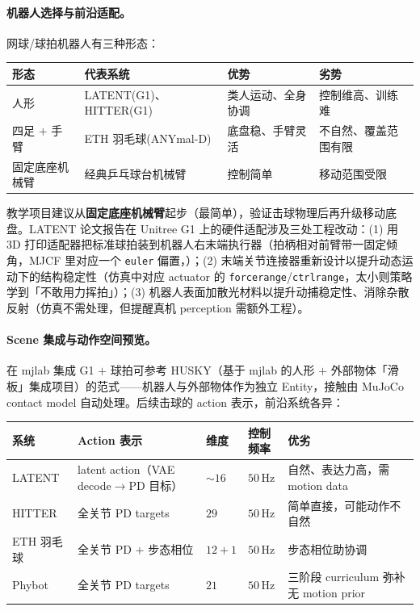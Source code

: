 \paragraph{机器人选择与前沿适配。}网球/球拍机器人有三种形态：

\begin{center}
\small
\begin{tabular}{@{}llp{3.2cm}p{3.2cm}@{}}
\toprule
形态 & 代表系统 & 优势 & 劣势 \\
\midrule
人形 & LATENT(G1)、HITTER(G1) & 类人运动、全身协调 & 控制维高、训练难 \\
四足 $+$ 手臂 & ETH 羽毛球(ANYmal-D) & 底盘稳、手臂灵活 & 不自然、覆盖范围有限 \\
固定底座机械臂 & 经典乒乓球台机械臂 & 控制简单 & 移动范围受限 \\
\bottomrule
\end{tabular}
\end{center}

教学项目建议从\textbf{固定底座机械臂}起步（最简单），验证击球物理后再升级移动底盘。LATENT 论文报告在 Unitree G1 上的硬件适配涉及三处工程改动\cite{tennis_latent2026}：(1) 用 3D 打印适配器把标准球拍装到机器人右末端执行器（拍柄相对前臂带一固定倾角，MJCF 里对应一个 \texttt{euler} 偏置，）；(2) 末端关节连接器重新设计以提升动态运动下的结构稳定性（仿真中对应 actuator 的 \texttt{forcerange}/\allowbreak\texttt{ctrlrange}，太小则策略学到「不敢用力挥拍」）；(3) 机器人表面加散光材料以提升动捕稳定性、消除杂散反射（仿真不需处理，但提醒真机 perception 需额外工程）。

\paragraph{Scene 集成与动作空间预览。}在 mjlab 集成 G1 $+$ 球拍可参考 HUSKY（基于 mjlab 的人形 $+$ 外部物体「滑板」集成项目\cite{husky2026}）的范式——机器人与外部物体作为独立 Entity，接触由 MuJoCo contact model 自动处理。后续击球的 action 表示，前沿系统各异：

\begin{center}
\small
\begin{tabular}{@{}llllp{3.0cm}@{}}
\toprule
系统 & Action 表示 & 维度 & 控制频率 & 优劣 \\
\midrule
LATENT & latent action（VAE decode$\to$PD 目标） & $\sim16$ & $50$\,Hz & 自然、表达力高，需 motion data \\
HITTER & 全关节 PD targets & $29$ & $50$\,Hz & 简单直接，可能动作不自然 \\
ETH 羽毛球 & 全关节 PD $+$ 步态相位 & $12{+}1$ & $50$\,Hz & 步态相位助协调 \\
Phybot & 全关节 PD targets & $21$ & $50$\,Hz & 三阶段 curriculum 弥补无 motion prior \\
\bottomrule
\end{tabular}
\end{center}

